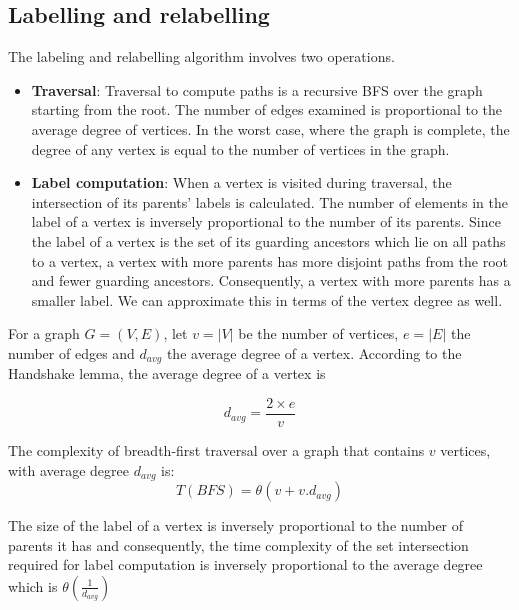 \subsection{Labelling and relabelling}
The labeling and relabelling algorithm involves two operations.
\begin{itemize}
	\item \textbf{Traversal}: Traversal to compute paths is a recursive BFS over the graph starting from the root. The number of edges examined is proportional to the average degree of vertices. In the worst case, where the graph is complete, the degree of any vertex is equal to the number of vertices in the graph. 
	
	\item \textbf{Label computation}: When a vertex is visited during traversal, the intersection of its parents' labels is calculated. The number of elements in the label of a vertex is inversely proportional to the number of its parents. Since the label of a vertex is the set of its guarding ancestors which lie on all paths to a vertex, a vertex with more parents has more disjoint paths from the root and fewer guarding ancestors. Consequently, a vertex with more parents has a smaller label. We can approximate this in terms of the vertex degree as well. 
\end{itemize}

For a graph $G = (V, E)$, let $v = \lvert V \rvert$ be the number of vertices, $e = \lvert E \rvert$ the number of edges and $d_{avg}$ the average degree of a vertex. According to the Handshake lemma, the average degree of a vertex is 

\begin{equation}
	\mathit{d_{avg}} = \frac{2 \times e}{v} 
\end{equation}


The complexity of breadth-first traversal over a graph that contains $v$ vertices, with average degree $d_{avg}$ is:
\begin{equation*}
	T(\mathit{BFS}) =\theta(v + v.d_{avg}) 
\end{equation*}

The size of the label of a vertex is inversely proportional to the number of parents it has and consequently, the time complexity of the set intersection required for label computation is inversely proportional to the average degree which is $\theta(\frac{1}{d_{avg}})$

